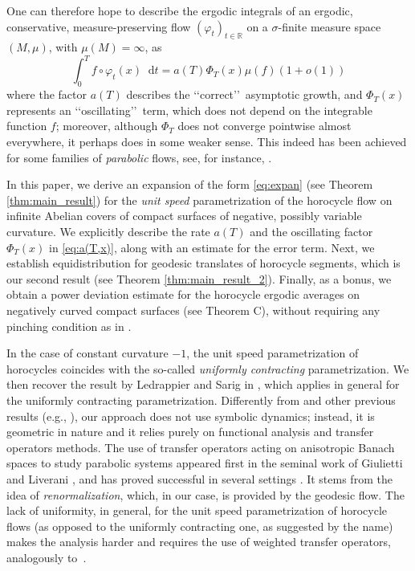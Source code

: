\documentclass[11pt,letterpaper]{amsart}
\newcommand \R {{ \mathbb R}}
\newcommand*{\diff}{\mathop{}\!\mathrm{d}}
\theoremstyle{definition}
\begin{document}
One can therefore hope to describe the ergodic integrals of an ergodic, conservative, measure-preserving flow $(\varphi_t)_{t\in \R}$ on a $\sigma$-finite measure space $(M,\mu)$, with $\mu(M)=\infty$, as
\begin{equation}\label{eq:expan}
\int_0^T f\circ \varphi_t(x) \diff t=a(T)\Phi_T(x) \mu(f)(1+o(1))
\end{equation}
where the factor $a(T)$ describes the \lq\lq correct\rq\rq\ asymptotic growth, and $\Phi_T(x)$ represents an \lq\lq oscillating\rq\rq\ term, which does not depend on the integrable function $f$; moreover, although $\Phi_T$ does not converge pointwise almost everywhere, it perhaps does in some weaker sense.
This indeed has been achieved for some families of {\it parabolic} flows, see, for instance, \cite{AvDoDu, BFRT, LeSa, LeSa2}. 



In this paper, we derive an expansion of the form \eqref{eq:expan} (see Theorem \ref{thm:main_result}) for the {\it unit speed} parametrization of the horocycle flow on infinite Abelian covers of compact surfaces of negative, possibly variable curvature. 
We explicitly describe the rate $a(T)$ and the oscillating factor $\Phi_T(x)$ in \eqref{eq:a(T,x)}, along with an estimate for the error term. Next, we establish equidistribution for geodesic translates of horocycle segments, which is our second result (see Theorem \ref{thm:main_result_2}). Finally, as a bonus, we obtain a power deviation estimate for the horocycle ergodic averages on negatively curved compact surfaces (see Theorem C), without requiring any pinching condition as in \cite[Corollary 3.4]{AdBa}.

In the case of constant curvature $-1$, the unit speed parametrization of horocycles coincides with the so-called {\it uniformly contracting} parametrization. We then recover the result by Ledrappier and Sarig in \cite{LeSa}, which applies in general for the uniformly contracting parametrization. 
Differently from \cite{LeSa} and other previous results (e.g., \cite{AvDoDu}), our approach does not use symbolic dynamics; instead, it is geometric in nature and it relies purely on functional analysis and transfer operators methods. The use of transfer operators acting on anisotropic Banach spaces to study parabolic systems appeared first in the seminal work of Giulietti and Liverani \cite{GiLi}, and has proved successful in several settings \cite{FaGoLa, AdBa, BuSi}. It stems from the idea of {\it renormalization}, which, in our case, is provided by the geodesic flow. The lack of uniformity, in general, for the unit speed parametrization of horocycle flows (as opposed to the uniformly contracting one, as suggested by the name) makes the analysis harder and requires the use of weighted transfer operators, analogously to~\cite{AdBa}.
\end{document}
